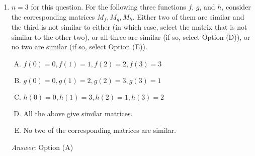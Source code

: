 \documentclass[10pt]{amsart}
\begin{document}
\begin{enumerate}
  \begin{itemize}
  \item Option (A): $M_f = \left[\begin{matrix} 0 & 1 & 0 \\ 1  & 0 & 0\\ 0 & 0 & 1 \\\end{matrix}\right]$
  \item Option (B): $M_g = \left[\begin{matrix} 1 & 0 & 0 \\ 0 & 0 & 1 \\ 0 & 1 & 0 \\\end{matrix}\right]$
  \item Option (C): $M_h = \left[\begin{matrix} 0 & 0 & 1 \\ 0 & 1 & 0 \\ 1 & 0 & 0 \\\end{matrix}\right]$
  \end{itemize}

  {\em Performance review}: 16 out of 25 got this. 4 chose (E), 3
  chose (C), 2 chose (B).

  {\em Historical note (last time)}: $8$ out of $19$ got this. $4$ chose (B),
  $3$ chose (E), $2$ each chose (A) and (C).

\item $n = 3$ for this question. For the following three functions
  $f$, $g$, and $h$, consider the corresponding matrices
  $M_f,M_g,M_h$. Either two of them are similar and the third is not
  similar to either (in which case, select the matrix that is not
  similar to the other two), or all three are similar (if so, select
  Option (D)), or no two are similar (if so, select Option (E)).

  \begin{enumerate}[(A)]
  \item $f(0) = 0, f(1) = 1, f(2) = 2, f(3) = 3$
  \item $g(0) = 0, g(1) = 2, g(2) = 3, g(3) = 1$
  \item $h(0) = 0, h(1) = 3, h(2) = 1, h(3) = 2$
  \item All the above give similar matrices.
  \item No two of the corresponding matrices are similar.
  \end{enumerate}

  {\em Answer}: Option (A)


\end{enumerate}
\end{document}
